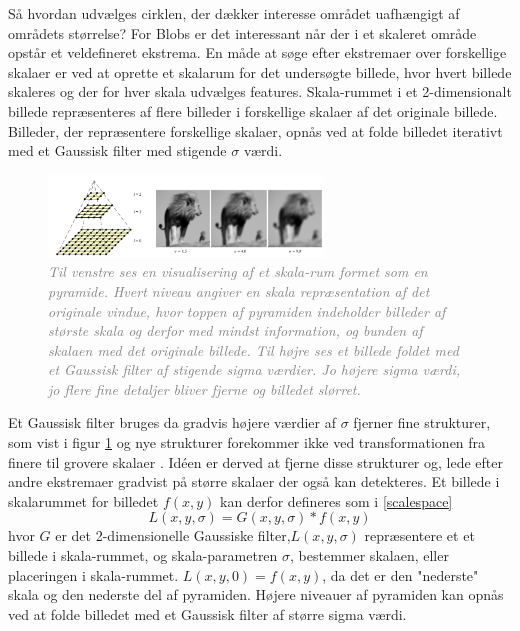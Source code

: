        \vspace{-2.5em}
\noindent
Så hvordan udvælges cirklen, der dækker interesse området uafhængigt af områdets størrelse?  For Blobs er det interessant når der i et skaleret område opstår et veldefineret ekstrema. En måde at søge efter ekstremaer over forskellige skalaer er ved at oprette et skalarum for det undersøgte billede, hvor hvert billede skaleres og der for hver skala udvælges features. Skala-rummet i et 2-dimensionalt billede repræsenteres af flere billeder i forskellige skalaer af det originale billede. Billeder, der repræsentere forskellige skalaer, opnås ved at folde billedet iterativt med et Gaussisk filter med stigende $\sigma$ værdi. 
\begin{figure}[H]
    \centering
    \includegraphics[width=0.65\textwidth]{fig/24.png}
    \vspace{-0.5em}   
    \begin{center}
    \caption{\textcolor{gray}{\footnotesize \textit{
Til venstre ses en visualisering af et skala-rum formet som en pyramide. Hvert niveau angiver en skala repræsentation af det originale vindue, hvor toppen af pyramiden indeholder billeder af største skala og derfor med mindst information, og bunden af skalaen med det originale billede. Til højre ses et billede foldet med et Gaussisk filter af stigende sigma værdier. Jo højere sigma værdi, jo flere fine detaljer bliver fjerne og billedet slørret.
    }}}
    \label{fig:mona}
     \end{center}
  \end{figure}
       \vspace{-2.5em}
\noindent
Et Gaussisk filter bruges da gradvis højere værdier af $\sigma$ fjerner fine strukturer, som vist i figur \ref{fig:mona} og nye strukturer forekommer ikke ved transformationen fra finere til grovere skalaer \cite{lindenscale}. Idéen er derved at fjerne disse strukturer og, lede efter  andre ekstremaer gradvist på større skalaer der også kan detekteres.
Et billede i skalarummet for billedet $f(x,y)$ kan derfor defineres som i \eqref{scalespace}
\begin{equation}
L(x,y,\sigma) = G(x,y,\sigma)\ast f(x,y)
\label{scalespace}
\end{equation}
hvor $G$ er det 2-dimensionelle Gaussiske filter,$L(x,y,\sigma)$ repræsentere et et billede i skala-rummet, og skala-parametren $\sigma$, bestemmer skalaen, eller placeringen i skala-rummet. $L(x,y,0) = f(x,y)$, da det er den "nederste" skala og den nederste del af pyramiden. Højere niveauer af pyramiden kan opnås ved at folde billedet med et Gaussisk filter af større sigma værdi.


